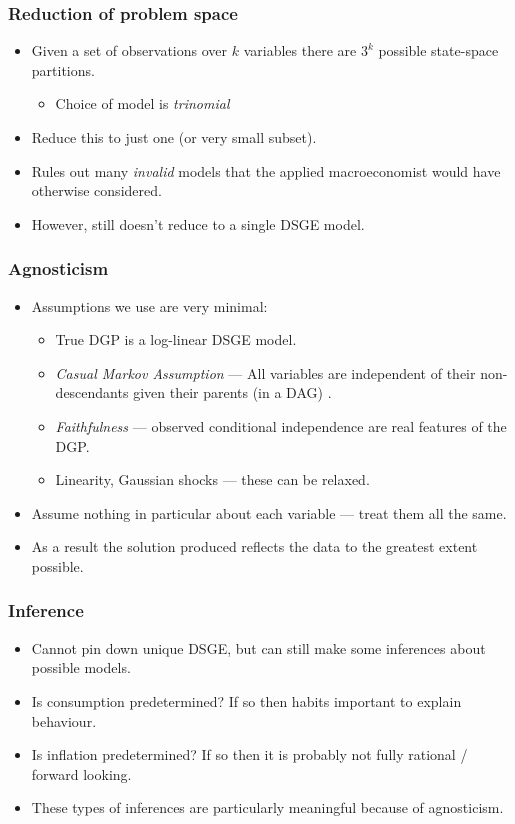 \documentclass{beamer}
\begin{document}
\begin{frame}
    \frametitle{Reduction of problem space}
    \begin{itemize}
        \item Given a set of observations over $k$ variables there are $3^k$ possible state-space partitions.
        \begin{itemize}
            \item Choice of model is \textit{trinomial}
        \end{itemize}
        \item Reduce this to just one (or very small subset).
        \item Rules out many \textit{invalid} models that the applied macroeconomist would have otherwise considered.
        \item However, still doesn't reduce to a single DSGE model.
    \end{itemize}
\end{frame}

\begin{frame}
    \frametitle{Agnosticism}
    \begin{itemize}
        \item Assumptions we use are very minimal:
        \begin{itemize}
            \item True DGP is a log-linear DSGE model.
            \item \textit{Casual Markov Assumption} --- All variables are independent of their non-descendants given their parents (in a DAG) \parencite{spirtes2016causal}.
            \item \textit{Faithfulness} --- observed conditional independence are real features of the DGP.
            \item Linearity, Gaussian shocks --- these can be relaxed.
        \end{itemize}
        \item Assume nothing in particular about each variable --- treat them all the same.
        \item As a result the solution produced reflects the data to the greatest extent possible.
    \end{itemize}
\end{frame}

\begin{frame}
    \frametitle{Inference}
    \begin{itemize}
        \item Cannot pin down unique DSGE, but can still make some inferences about possible models.
        \item Is consumption predetermined? If so then habits important to explain behaviour.
        \item Is inflation predetermined? If so then it is probably not fully rational / forward looking.
        \item These types of inferences are particularly meaningful because of agnosticism.
    \end{itemize}
\end{frame}
\end{document}
